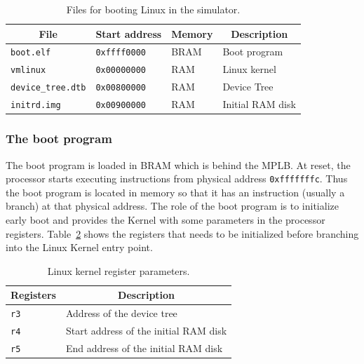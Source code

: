 \begin{table}[!ht]
	\begin{center}
		\begin{tabular}{|l|l|l|l|}
		\hline
		\multicolumn{1}{|c|}{\textbf{File}} & \multicolumn{1}{|c|}{\textbf{Start address}} & \multicolumn{1}{|c|}{\textbf{Memory}} & \multicolumn{1}{|c|}{\textbf{Description}}\\
		\hline
		\texttt{boot.elf} & \texttt{0xffff0000} & BRAM & Boot program\\
		\hline
		\texttt{vmlinux} & \texttt{0x00000000} & RAM & Linux kernel\\
		\hline
		\texttt{device\_tree.dtb} & \texttt{0x00800000} & RAM & Device Tree\\
		\hline
		\texttt{initrd.img} & \texttt{0x00900000} & RAM & Initial RAM disk\\
		\hline
		\end{tabular}
	\end{center}
	\caption{Files for booting Linux in the simulator.}
	\label{table:linux_files}
\end{table}

\subsubsection{The boot program}
\label{boot_program}

The boot program is loaded in BRAM which is behind the MPLB.
At reset, the processor starts executing instructions from physical address \texttt{0xfffffffc}.
Thus the boot program is located in memory so that it has an instruction (usually a branch) at that physical address.
The role of the boot program is to initialize early boot and provides the Kernel with some parameters in the processor registers.
Table~\ref{table:linux_register_parameters} shows the registers that needs to be initialized before branching into the Linux Kernel entry point.

\begin{table}[!ht]
	\begin{center}
		\begin{tabular}{|l|l|}
		\hline
		\multicolumn{1}{|c|}{\textbf{Registers}} & \multicolumn{1}{|c|}{\textbf{Description}}\\
		\hline
		\texttt{r3} & Address of the device tree\\
		\hline
		\texttt{r4} & Start address of the initial RAM disk\\
		\hline
		\texttt{r5} & End address of the initial RAM disk\\
		\hline
		\end{tabular}
	\end{center}
	\caption{Linux kernel register parameters.}
	\label{table:linux_register_parameters}
\end{table}

